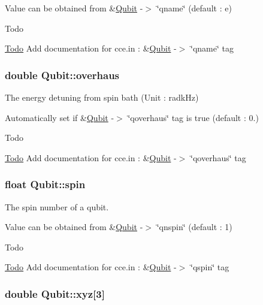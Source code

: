 Value can be obtained from \&\hyperlink{structQubit}{Qubit} -\/$>$ \char`\"{}qname\char`\"{} (default \-: e) \begin{DoxyRefDesc}{Todo}
\item[\hyperlink{todo__todo000015}{Todo}]Add documentation for cce.\-in \-: \&\hyperlink{structQubit}{Qubit} -\/$>$ \char`\"{}qname\char`\"{} tag \end{DoxyRefDesc}
\hypertarget{structQubit_aecb3943042094c4be043f375626dbd24}{
\subsubsection[{overhaus}]{\setlength{\rightskip}{0pt plus 5cm}double Qubit\-::overhaus}}\label{structQubit_aecb3943042094c4be043f375626dbd24}


The energy detuning from spin bath (Unit \-: radk\-Hz) 

Automatically set if \&\hyperlink{structQubit}{Qubit} -\/$>$ \char`\"{}qoverhaus\char`\"{} tag is true (default \-: 0.) \begin{DoxyRefDesc}{Todo}
\item[\hyperlink{todo__todo000020}{Todo}]Add documentation for cce.\-in \-: \&\hyperlink{structQubit}{Qubit} -\/$>$ \char`\"{}qoverhaus\char`\"{} tag \end{DoxyRefDesc}
\hypertarget{structQubit_a858930b7d9d9cafc70f26ab7993dadad}{
\subsubsection[{spin}]{\setlength{\rightskip}{0pt plus 5cm}float Qubit\-::spin}}\label{structQubit_a858930b7d9d9cafc70f26ab7993dadad}


The spin number of a qubit. 

Value can be obtained from \&\hyperlink{structQubit}{Qubit} -\/$>$ \char`\"{}qnspin\char`\"{} (default \-: 1) \begin{DoxyRefDesc}{Todo}
\item[\hyperlink{todo__todo000016}{Todo}]Add documentation for cce.\-in \-: \&\hyperlink{structQubit}{Qubit} -\/$>$ \char`\"{}qspin\char`\"{} tag \end{DoxyRefDesc}
\hypertarget{structQubit_a799cb32b473160eb8e9e4aa6c9c39b18}{
\subsubsection[{xyz}]{\setlength{\rightskip}{0pt plus 5cm}double Qubit\-::xyz\mbox{[}3\mbox{]}}}\label{structQubit_a799cb32b473160eb8e9e4aa6c9c39b18}



